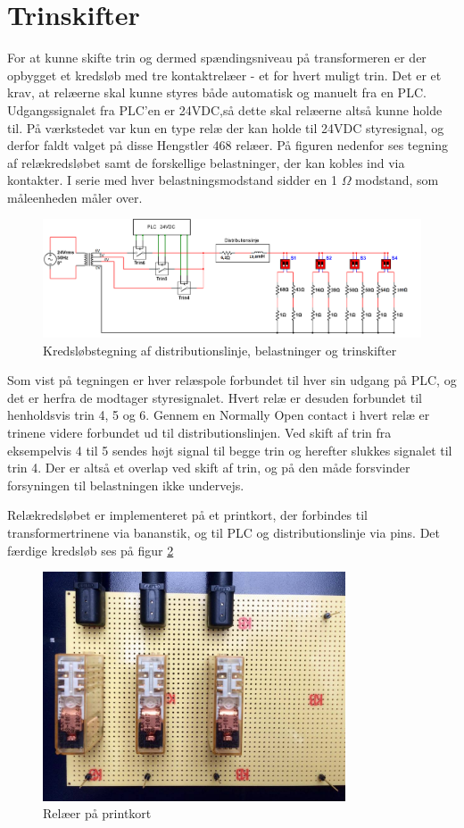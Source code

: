 

\section{Trinskifter}
\label{sec:Trinskifter}
For at kunne skifte trin og dermed spændingsniveau på transformeren er der opbygget et kredsløb med tre kontaktrelæer - et for hvert muligt trin. Det er et krav, at relæerne skal kunne styres både automatisk og manuelt fra en PLC. Udgangssignalet fra PLC'en er 24VDC,så dette skal relæerne altså kunne holde til. På værkstedet var kun en type relæ der kan holde til 24VDC styresignal, og derfor faldt valget på disse Hengstler 468 relæer. På figuren nedenfor ses tegning af relækredsløbet samt de forskellige belastninger, der kan kobles ind via kontakter. I serie med hver belastningsmodstand sidder en 1 $\Omega$ modstand, som måleenheden måler over. 


\begin{figure}[H] 
	\centering
	\includegraphics[width=1\textwidth]{Figure/Trinskiftertegning2}
	\caption{Kredsløbstegning af distributionslinje, belastninger og trinskifter}
	\label{fig:Trinskiftertegning2}
\end{figure}

Som vist på tegningen er hver relæspole forbundet til hver sin udgang på PLC, og det er herfra de modtager styresignalet. Hvert relæ er desuden forbundet til henholdsvis trin 4, 5 og 6. Gennem en Normally Open contact i hvert relæ er trinene videre forbundet ud til distributionslinjen. Ved skift af trin fra eksempelvis 4 til 5 sendes højt signal til begge trin og herefter slukkes signalet til trin 4. Der er altså et overlap ved skift af trin, og på den måde forsvinder forsyningen til belastningen ikke undervejs. 

Relækredsløbet er implementeret på et printkort, der forbindes til transformertrinene via bananstik, og til PLC og distributionslinje via pins. Det færdige kredsløb ses på figur \ref{fig:Relaekredsloeb}

\begin{figure}[H] 
	\centering
	\includegraphics[width=0.8\textwidth]{Figure/Relaekredsl}
	\caption{Relæer på printkort}
	\label{fig:Relaekredsloeb}
\end{figure}

